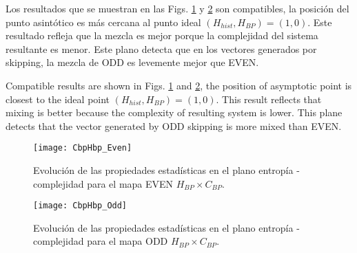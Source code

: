 Los resultados que se muestran en las Figs. \ref{fig:EVEN_HC} y \ref{fig:ODD_HC} son compatibles, la posición del punto asintótico es más cercana al punto ideal $(H_{hist}, H_{BP}) = (1, 0)$.
Este resultado refleja que la mezcla es mejor porque la complejidad del sistema resultante es menor.
Este plano detecta que en los vectores generados por skipping, la mezcla de ODD es levemente mejor que EVEN.

Compatible results are shown in Figs. \ref{fig:EVEN_HC} and \ref{fig:ODD_HC}, the position of asymptotic point is closest to the ideal point $(H_{hist}, H_{BP})=(1, 0)$.
This result reflects that mixing is better because the complexity of resulting system is lower.
This plane detects that the vector generated by ODD skipping is more mixed than EVEN.
%
\begin{figure}[htpb]
	\centering
	\texttt{[image: CbpHbp\_Even]}
	\caption{Evolución de las propiedades estadísticas en el plano entropía - complejidad para el mapa EVEN $H_{BP} \times C_{BP}$.}
	\label{fig:EVEN_HC}
\end{figure}

\begin{figure}[htpb]
	\centering
	\texttt{[image: CbpHbp\_Odd]}
	\caption{Evolución de las propiedades estadísticas en el plano entropía - complejidad para el mapa ODD $H_{BP} \times C_{BP}$.}
	\label{fig:ODD_HC}
\end{figure}